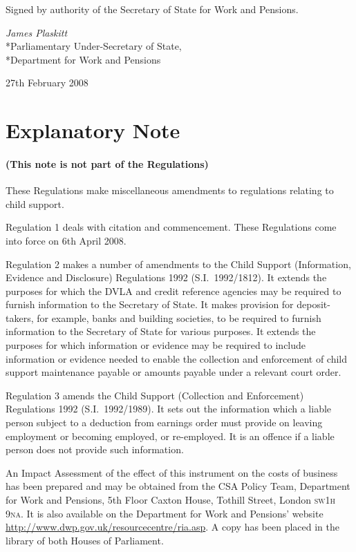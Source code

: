\documentclass[12pt,a4paper]{article}
\begin{document}
\bigskip

Signed 
by authority of the 
Secretary of State for Work and Pensions.

{\raggedleft
\emph{James Plaskitt}\\*Parliamentary Under-Secretary of State,\\*Department for Work and Pensions

}

27th February 2008

\small

\part{Explanatory Note}

\renewcommand\parthead{— Explanatory Note}

\subsection*{(This note is not part of the Regulations)}

These Regulations make miscellaneous amendments to regulations relating to child support.

Regulation 1 deals with citation and commencement. These Regulations come into force on 6th April 2008.

Regulation 2 makes a number of amendments to the Child Support (Information, Evidence and Disclosure) Regulations 1992 (S.I.\ 1992/1812). It extends the purposes for which the DVLA and credit reference agencies may be required to furnish information to the Secretary of State. It makes provision for deposit-takers, for example, banks and building societies, to be required to furnish information to the Secretary of State for various purposes. It extends the purposes for which information or evidence may be required to include information or evidence needed to enable the collection and enforcement of child support maintenance payable or amounts payable under a relevant court order.

Regulation 3 amends the Child Support (Collection and Enforcement) Regulations 1992 (S.I.\ 1992/1989). It sets out the information which a liable person subject to a deduction from earnings order must provide on leaving employment or becoming employed, or re-employed. It is an offence if a liable person does not provide such information.

An Impact Assessment of the effect of this instrument on the costs of business has been prepared and may be obtained from the CSA Policy Team, Department for Work and Pensions, 5th Floor Caxton House, Tothill Street, London \textsc{\lowercase{SW1H 9NA}}. It is also available on the Department for Work and Pensions’ website \url{http://www.dwp.gov.uk/resourcecentre/ria.asp}. A copy has been placed in the library of both Houses of Parliament. 
\end{document}
